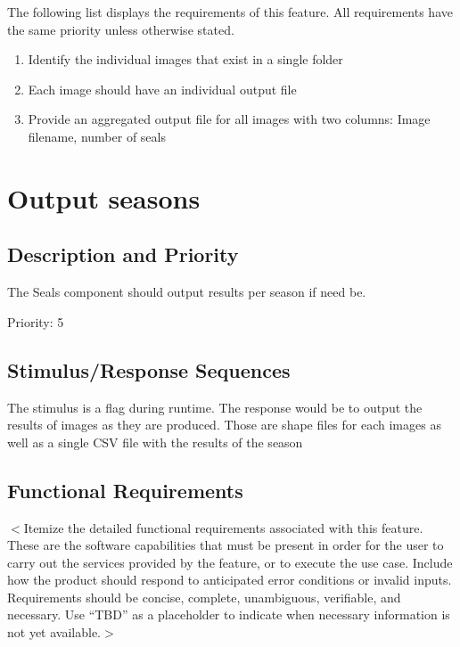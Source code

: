 \documentclass{scrreprt}
\begin{document}
The following list displays the requirements of this feature. All requirements
have the same priority unless otherwise stated. 


\begin{enumerate}[REQ-1:]
\item Identify the individual images that exist in a single folder
\item Each image should have an individual output file
\item Provide an aggregated output file for all images with two columns: Image 
filename, number of seals
\end{enumerate}

\section{Output seasons}
\iffalse
$<$Don’t really say “System Feature 1.” State the feature name in just a few 
words.$>$
\fi

\subsection{Description and Priority}
\iffalse
$<$Provide a short description of the feature and indicate whether it is of 
High, Medium, or Low priority. You could also include specific priority 
component ratings, such as benefit, penalty, cost, and risk (each rated on a 
relative scale from a low of 1 to a high of 9).$>$
\fi

The Seals component should output results per season if need be.

Priority: 5

\subsection{Stimulus/Response Sequences}
\iffalse
$<$List the sequences of user actions and system responses that stimulate the 
behavior defined for this feature. These will correspond to the dialog elements 
associated with use cases.$>$
\fi

The stimulus is a flag during runtime. The response would be to output the
results of images as they are produced. Those are shape files for each images
as well as a single CSV file with the results of the season

\subsection{Functional Requirements}
\iffalse
$<$Itemize the detailed functional requirements associated with this feature.  
These are the software capabilities that must be present in order for the user 
to carry out the services provided by the feature, or to execute the use case.  
Include how the product should respond to anticipated error conditions or 
invalid inputs. Requirements should be concise, complete, unambiguous, 
verifiable, and necessary. Use “TBD” as a placeholder to indicate when necessary 
information is not yet available.$>$
\end{document}
